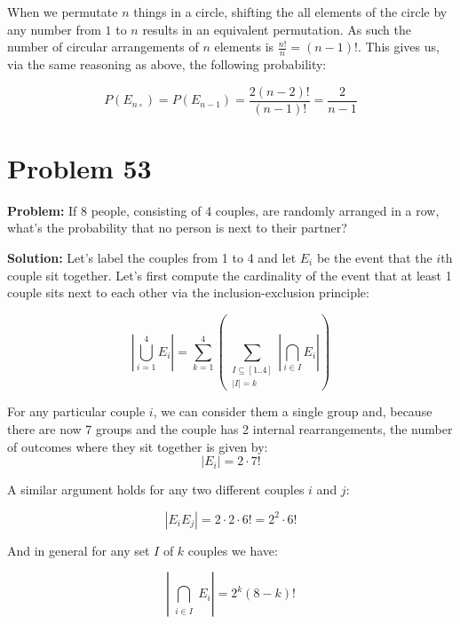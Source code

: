 \documentclass{article}
\begin{document}
When we permutate $n$ things in a circle, shifting the all elements of the circle by any number from $1$ to $n$ results in an equivalent permutation. As such the number of circular arrangements of $n$ elements is $\frac{n!}{n}=(n-1)!$. This gives us, via the same reasoning as above, the following probability:

\begin{equation*}
    P(E_{n\circ})=P(E_{n-1})=\frac{2(n-2)!}{(n-1)!}=\frac{2}{n-1}
\end{equation*}

\section*{Problem 53}
\noindent\textbf{Problem:} If 8 people, consisting of 4 couples, are randomly arranged in a row, what's the probability that no person is next to their partner?
\bigskip

\noindent\textbf{Solution:} Let's label the couples from 1 to 4 and let $E_i$
be the event that the $i$th couple sit together. Let's first compute the cardinality of the event that at least 1 couple sits next to each other via the inclusion-exclusion principle:


\begin{equation*}
    \left|\bigcup_{i=1}^4 E_i\right|=\sum_{k=1}^4\left(\sum_{\substack{I\subseteq[1..4]\\|I|=k}}\left|\bigcap_{i\in I} E_i\right|\right)
\end{equation*}

For any particular couple $i$, we can consider them a single group and, because there are now 7 groups and the couple has 2 internal rearrangements, the number of outcomes where they sit together is given by:
\begin{equation*}
    |E_i|=2\cdot 7!
\end{equation*}

A similar argument holds for any two different couples $i$ and $j$:

\begin{equation*}
    |E_iE_j|=2\cdot 2\cdot 6!=2^2\cdot6!
\end{equation*}

And in general for any set $I$ of $k$ couples we have:

\begin{equation*}
    \left|\bigcap_{\substack{i\in I}} E_i\right|=2^k(8-k)!
\end{equation*}
\end{document}
